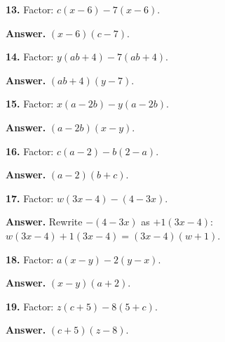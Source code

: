 \documentclass{ximera}
\begin{document}
\begin{problem}

\textbf{13.} Factor: $c(x-6)-7(x-6)$. \qquad

\begin{hint}
\textbf{Answer.} $(x-6)(c-7)$.
\end{hint}
\end{problem}

\begin{problem}

\textbf{14.} Factor: $y(ab+4)-7(ab+4)$. \qquad

\begin{hint}
\textbf{Answer.} $(ab+4)(y-7)$.
\end{hint}
\end{problem}

\begin{problem}

\textbf{15.} Factor: $x(a-2b)-y(a-2b)$. \qquad

\begin{hint}
\textbf{Answer.} $(a-2b)(x-y)$.
\end{hint}
\end{problem}

\begin{problem}

\textbf{16.} Factor: $c(a-2)-b(2-a)$. \qquad

\begin{hint}
\textbf{Answer.} $(a-2)(b+c)$.
\end{hint}
\end{problem}

\begin{problem}

\textbf{17.} Factor: $w(3x-4)-(4-3x)$.

\begin{hint}
\textbf{Answer.} Rewrite $-(4-3x)$ as $+1(3x-4)$:
$w(3x-4)+1(3x-4)=(3x-4)(w+1)$.
\end{hint}
\end{problem}

\begin{problem}

\textbf{18.} Factor: $a(x-y)-2(y-x)$. \qquad

\begin{hint}
\textbf{Answer.} $(x-y)(a+2)$.
\end{hint}
\end{problem}

\begin{problem}

\textbf{19.} Factor: $z(c+5)-8(5+c)$. \qquad

\begin{hint}
\textbf{Answer.} $(c+5)(z-8)$.
\end{hint}
\end{problem}
\end{document}
